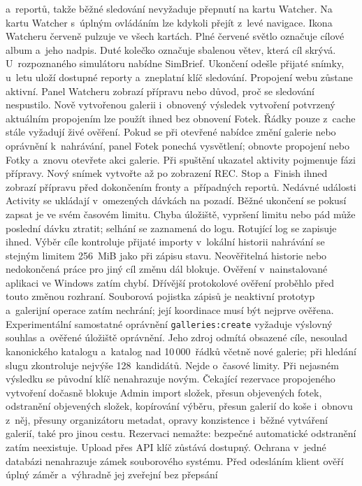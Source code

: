 \documentclass[11pt,a4paper]{article}
\begin{document}
a~reportů, takže běžné sledování nevyžaduje přepnutí na kartu Watcher.
Na kartu Watcher s~úplným ovládáním lze kdykoli přejít z~levé navigace.
Ikona Watcheru
červeně pulzuje ve všech kartách. Plné červené světlo označuje cílové album
a~jeho nadpis. Duté kolečko označuje sbalenou větev, která cíl skrývá.
U~rozpoznaného
simulátoru nabídne SimBrief. Ukončení odešle přijaté snímky, u~letu uloží
dostupné reporty a~zneplatní klíč sledování. Propojení webu zůstane aktivní.
Panel Watcheru zobrazí přípravu nebo důvod, proč se sledování nespustilo.
Nově vytvořenou galerii i~obnovený výsledek vytvoření potvrzený aktuálním
propojením lze použít ihned bez obnovení Fotek. Řádky pouze z~cache stále
vyžadují živé ověření. Pokud se při otevřené nabídce změní galerie nebo
oprávnění k~nahrávání, panel Fotek ponechá vysvětlení; obnovte propojení
nebo Fotky a~znovu otevřete akci galerie.
Při spuštění ukazatel aktivity pojmenuje fázi přípravy. Nový snímek vytvořte
až po zobrazení REC. Stop a~Finish ihned zobrazí přípravu před dokončením
fronty a~případných reportů.
Nedávné události Activity se ukládají v~omezených dávkách na pozadí. Běžné
ukončení se pokusí zapsat je ve svém časovém limitu. Chyba úložiště, vypršení
limitu nebo pád může poslední dávku ztratit; selhání se zaznamená do logu.
Rotující log se zapisuje ihned.
Výběr cíle kontroluje přijaté importy v~lokální historii nahrávání se stejným
limitem 256~MiB jako při zápisu stavu. Neověřitelná historie nebo nedokončená
práce pro jiný cíl změnu dál blokuje.
Ověření v~nainstalované aplikaci ve Windows zatím chybí. Dřívější
protokolové ověření proběhlo před touto změnou rozhraní.
Souborová pojistka zápisů je neaktivní prototyp a~galerijní operace zatím
nechrání; její koordinace musí být nejprve ověřena.
Experimentální samostatné oprávnění \texttt{galleries:create} vyžaduje výslovný
souhlas a~ověřené úložiště oprávnění. Jeho zdroj odmítá obsazené cíle,
nesoulad kanonického katalogu a~katalog nad
10\,000~řádků včetně nové galerie; při hledání slugu zkontroluje nejvýše
128~kandidátů. Nejde o~časové limity. Při nejasném výsledku
se původní klíč nenahrazuje novým.
Čekající rezervace propojeného vytvoření dočasně blokuje Admin import složek,
přesun objevených fotek, odstranění objevených složek, kopírování výběru,
přesun galerií do koše i~obnovu z~něj, přesuny organizátoru metadat,
opravy konzistence i~běžné vytváření
galerií, také pro jinou cestu. Rezervaci nemažte: bezpečné
automatické odstranění zatím neexistuje. Upload přes API klíč zůstává dostupný.
Ochrana v~jedné databázi nenahrazuje zámek souborového systému.
Před odesláním klient ověří úplný záměr a~výhradně jej zveřejní bez přepsání
\end{document}
